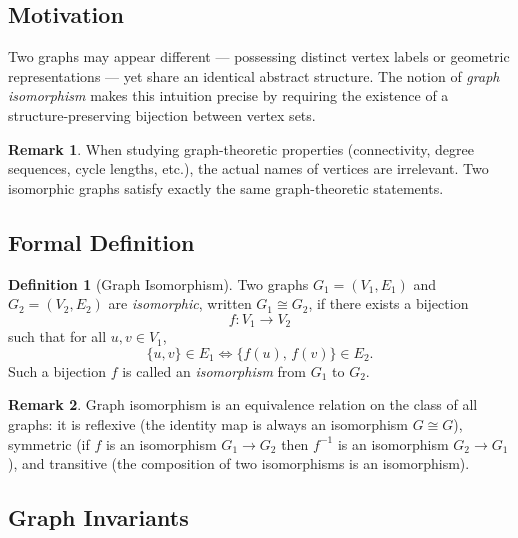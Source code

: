 \documentclass[12pt,a4paper]{article}
\theoremstyle{definition}
\newtheorem{definition}{Definition}[section]
\newtheorem{remark}{Remark}[section]
\theoremstyle{plain}
\begin{document}
\subsection{Motivation}

Two graphs may appear different — possessing distinct vertex labels or
geometric representations — yet share an identical abstract structure.  The
notion of \emph{graph isomorphism} makes this intuition precise by requiring
the existence of a structure-preserving bijection between vertex sets.

\begin{remark}\label{rem:iso-motivation}
  When studying graph-theoretic properties (connectivity, degree sequences,
  cycle lengths, etc.), the actual names of vertices are irrelevant.  Two
  isomorphic graphs satisfy exactly the same graph-theoretic statements.
\end{remark}

\subsection{Formal Definition}

\begin{definition}[Graph Isomorphism]\label{def:isomorphism}
  Two graphs \(G_1 = (V_1, E_1)\) and \(G_2 = (V_2, E_2)\) are
  \emph{isomorphic}, written \(G_1 \cong G_2\), if there exists a bijection
  \begin{equation}
    f : V_1 \longrightarrow V_2
    \label{eq:bijection}
  \end{equation}
  such that for all \(u, v \in V_1\),
  \begin{equation}
    \{u,v\} \in E_1 \iff \{f(u),\, f(v)\} \in E_2.
    \label{eq:iso-condition}
  \end{equation}
  Such a bijection \(f\) is called an \emph{isomorphism} from \(G_1\) to
  \(G_2\).
\end{definition}

\begin{remark}\label{rem:iso-equivalence}
  Graph isomorphism is an equivalence relation on the class of all graphs:
  it is reflexive (the identity map is always an isomorphism
  \(G \cong G\)), symmetric (if \(f\) is an isomorphism \(G_1 \to G_2\)
  then \(f^{-1}\) is an isomorphism \(G_2 \to G_1\)), and transitive
  (the composition of two isomorphisms is an isomorphism).
\end{remark}

\subsection{Graph Invariants}
\end{document}
